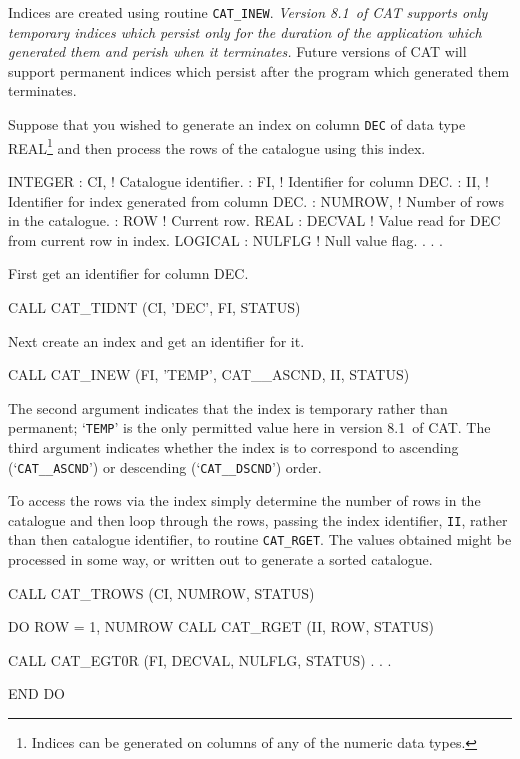 \documentclass[11pt,twoside]{starlink}
\providecommand{\CATversion}{8.1~}
\begin{document}
Indices are created using routine \texttt{CAT\_INEW}. \textit{Version
\CATversion of CAT supports only temporary indices which persist only
for the duration of the application which generated them and perish
when it terminates.} Future versions of CAT will support permanent
indices which persist after the program which generated them terminates.

Suppose that you wished to generate an index on column \texttt{DEC} of data
type REAL\footnote{Indices can be generated on columns of any of the
numeric data types.} and then process the rows of the catalogue
using this index.

\begin{terminalv}
      INTEGER
     :  CI,      ! Catalogue identifier.
     :  FI,      ! Identifier for column DEC.
     :  II,      ! Identifier for index generated from column DEC.
     :  NUMROW,  ! Number of rows in the catalogue.
     :  ROW      ! Current row.
      REAL
     :  DECVAL   ! Value read for DEC from current row in index.
      LOGICAL
     :  NULFLG   ! Null value flag.
       .
       .
       .
\end{terminalv}

First get an identifier for column DEC.

\begin{terminalv}
      CALL CAT_TIDNT (CI, 'DEC', FI, STATUS)
\end{terminalv}

Next create an index and get an identifier for it.

\begin{terminalv}
      CALL CAT_INEW (FI, 'TEMP', CAT__ASCND, II, STATUS)
\end{terminalv}

The second argument indicates that the index is temporary rather than
permanent; `\texttt{TEMP}' is the only permitted value here in version
\CATversion of CAT. The third argument indicates whether the index is to
correspond to ascending (`\texttt{CAT\_\_ASCND}') or descending (`\texttt{CAT\_\_DSCND}') order.

To access the rows via the index simply determine the number of rows in
the catalogue and then loop through the rows, passing the index identifier,
\texttt{II}, rather than then catalogue identifier, to routine \texttt{CAT\_RGET}. The values obtained might be processed in some way, or
written out to generate a sorted catalogue.

\begin{terminalv}
      CALL CAT_TROWS (CI, NUMROW, STATUS)

      DO ROW = 1, NUMROW
         CALL CAT_RGET (II, ROW, STATUS)

         CALL CAT_EGT0R (FI, DECVAL, NULFLG, STATUS)
           .
           .
           .

      END DO
\end{terminalv}
\end{document}
